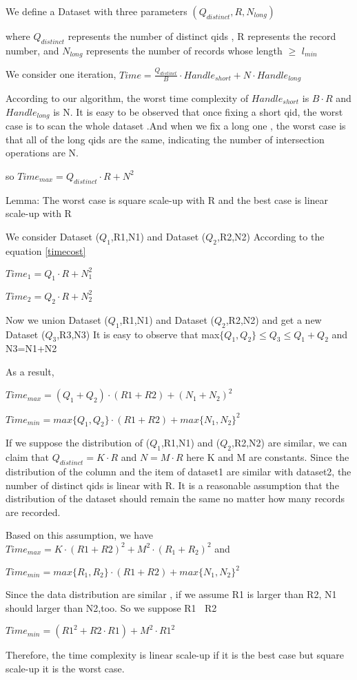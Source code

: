 \documentclass{article}
\begin{document}
We define a Dataset with three parameters $( Q_{distinct} ,R, N_{long})$

where $Q_{distinct}$ represents the number of distinct qids , R represents the record number, 
and $N_{long}$ represents the number of records whose length $\geq$ $l_{min}$

We consider one iteration,
$Time =\frac{Q_{distinct}}{B} \cdot Handle_{short}+ N\cdot Handle_{long}$

According to our algorithm, the worst time complexity of $Handle_{short}$  is $B\cdot R$ and $Handle_{long}$ is N.
It is easy to be observed that once fixing a short qid, the worst case is to scan the whole dataset .And when we  fix
a long one , the worst case is that all of the long qids are the same, indicating the number of intersection operations
are N.

so $Time_{max} =Q_{distinct}\cdot R+ N^2$\label{timecost}






Lemma:  The worst case is square scale-up with R and the best case is linear scale-up with R

We consider Dataset ($Q_{1}$,R1,N1) and Dataset ($Q_{2}$,R2,N2)
According to the equation \ref{timecost}

 $Time_{1} =Q_{1}\cdot R+ N_{1}^2$
 
  $Time_{2} =Q_{2}\cdot R+ N_{2}^2$
  
Now we union Dataset ($Q_{1}$,R1,N1) and Dataset ($Q_{2}$,R2,N2) and get a new Dataset ($Q_{3}$,R3,N3)
It is easy to observe that  max$\{Q_{1},Q_{2}\}   \leq Q_{3} \leq Q_{1}+Q_{2}$ and N3=N1+N2

As a result,

$Time_{max} =(Q_{1}+Q_{2})\cdot (R1+R2)+ (N_{1}+N_{2})^2$


$Time_{min} =max\{Q_{1},Q_{2}\}\cdot (R1+R2)+max\{N_{1},N_{2}\}^2$

If we suppose the distribution of ($Q_{1}$,R1,N1) and  ($Q_{2}$,R2,N2) are similar, we can claim that  $Q_{distinct}=K\cdot R$ 
and $N=M\cdot R$
here K and M are constants. Since the distribution of the column and the item of dataset1 are similar with  dataset2, the number of distinct qids is linear with R. It is a reasonable assumption that the distribution of the dataset should remain the same no matter how many records are recorded.

Based on this assumption, we have $Time_{max} =K\cdot(R1+R2)^2+ M^2\cdot(R_{1}+R_{2})^2$ and 



$Time_{min} =max\{R_{1},R_{2}\}\cdot (R1+R2)+max\{N_{1},N_{2}\}^2$

Since the data distribution are similar , if we assume R1 is larger than R2, N1 should larger than N2,too.
So we suppose R1 $\>$ R2

$Time_{min} = (R1^2+R2\cdot R1)+M^2\cdot R1^2$

Therefore, the time complexity is linear scale-up if it is the best case but square scale-up it is the worst case.
\end{document}
